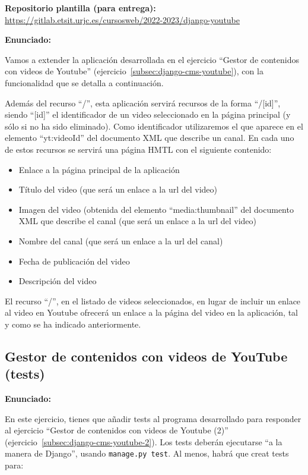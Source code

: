 \textbf{Repositorio plantilla (para entrega):} \\
\url{https://gitlab.etsit.urjc.es/cursosweb/2022-2023/django-youtube}

\textbf{Enunciado:}

Vamos a extender la aplicación desarrollada en el ejercicio ``Gestor de contenidos con videos de Youtube'' (ejercicio~\ref{subsec:django-cms-youtube}), con la funcionalidad que se detalla a continuación.

Además del recurso ``/'', esta aplicación servirá recursos de la forma ``/[id]'', siendo ``[id]'' el identificador de un video seleccionado en la página principal (y sólo si no ha sido eliminado). Como identificador utilizaremos el que aparece en el elemento ``yt:videoId'' del documento XML que describe un canal. En cada uno de estos recursos se servirá una página HMTL con el siguiente contenido:

\begin{itemize}
\item Enlace a la página principal de la aplicación
\item Título del video (que será un enlace a la url del video)
\item Imagen del video (obtenida del elemento ``media:thumbnail'' del documento XML que describe el canal (que será un enlace a la url del video)
\item Nombre del canal (que será un enlace a la url del canal)
\item Fecha de publicación del video
\item Descripción del video
\end{itemize}

El recurso ``/'', en el listado de videos seleccionados, en lugar de incluir un enlace al video en Youtube ofrecerá un enlace a la página del video en la aplicación, tal y como se ha indicado anteriormente.

\subsection{Gestor de contenidos con videos de YouTube (tests)}
\label{subsec:django-cms-youtube-tests}

\textbf{Enunciado:}

En este ejercicio, tienes que añadir tests al programa desarrollado para responder al ejercicio  ``Gestor de contenidos con videos de Youtube (2)'' (ejercicio~\ref{subsec:django-cms-youtube-2}). Los tests deberán ejecutarse ``a la manera de Django'', usando \verb|manage.py test|. Al menos, habrá que creat tests para:


